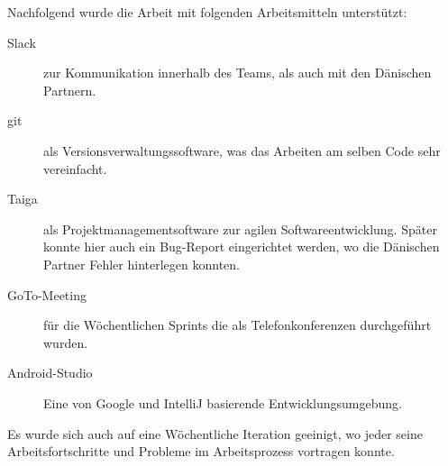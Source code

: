 Nachfolgend wurde die Arbeit mit folgenden Arbeitsmitteln unterstützt:
\begin{description}
	\item[Slack] zur Kommunikation innerhalb des Teams, als auch mit den Dänischen Partnern.
	\item[\gls{git}] als Versionsverwaltungssoftware, was das Arbeiten am selben Code sehr vereinfacht.
	\item[Taiga] als Projektmanagementsoftware zur agilen Softwareentwicklung. Später konnte hier auch ein Bug-Report eingerichtet werden, wo die Dänischen Partner Fehler hinterlegen konnten.
	\item[GoTo-Meeting] für die Wöchentlichen Sprints die als  Telefonkonferenzen durchgeführt wurden.
	\item[Android-Studio] Eine von Google und IntelliJ  basierende Entwicklungsumgebung.
\end{description}
 Es wurde sich auch auf eine Wöchentliche Iteration geeinigt, wo jeder seine Arbeitsfortschritte und  Probleme im Arbeitsprozess vortragen  konnte.
 
